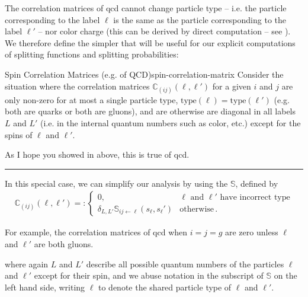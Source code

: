 The correlation matrices of \gls{qcd} cannot change particle type -- i.e. the particle corresponding to the label \(\ell\) is the same as the particle corresponding to the label \(\ell'\) -- nor color charge (this can be derived by direct computation -- see ).
%
We therefore define the simpler  that will be useful for our explicit computations of splitting functions and splitting probabilities:

\begin{definitionbox}{Spin Correlation Matrices (e.g. of QCD)}{spin-correlation-matrix}
    Consider the situation where the correlation matrices \(\mathbb{C}_{(ij)}(\ell, \ell')\) for a given \(i\) and \(j\) are only non-zero for at most a single particle type, \(\text{type}(\ell) = \text{type}(\ell')\) (e.g. both are quarks or both are gluons), and are otherwise are diagonal in all labels \(L\) and \(L'\) (i.e. in the internal quantum numbers such as color, etc.) except for the spins of \(\ell\) and \(\ell'\).

    As I hope you showed in  above, this is true of \gls{qcd}.

    \vspace{7pt}
    \hrule
    \vspace{7pt}

    In this special case, we can simplify our analysis by using the    \(\mathbb{S}\), defined by
    \begin{align}
        \mathbb{C}_{(ij)}(\ell, \ell')
        =:
        \begin{cases}
            0,&\ell \text{ and } \ell' \text{ have incorrect type}
            \\
            \delta_{L, L'}
            \mathbb{S}_{i j \leftarrow \ell}(s_\ell, s_\ell')
            &
            \text{otherwise}
            \,.
        \end{cases}
    \end{align}

    For example, the correlation matrices of \gls{qcd} when \(i = j = g\) are zero unless \(\ell\) and \(\ell'\) are both gluons.

    where again \(L\) and \(L'\) describe all possible quantum numbers of the particles \(\ell\) and \(\ell'\) except for their spin, and we abuse notation in the subscript of \(\mathbb{S}\) on the left hand side, writing \(\ell\) to denote the shared particle type of \(\ell\) and \(\ell'\).
\end{definitionbox}


